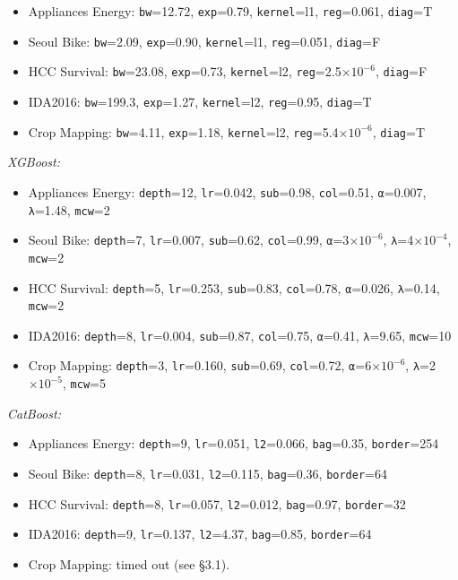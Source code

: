 \documentclass[
  11pt,
  onecolumn]{article}
\providecommand{\tightlist}{%
  \setlength{\itemsep}{0pt}\setlength{\parskip}{0pt}}
\begin{document}
\begin{itemize}
\tightlist
\item
  Appliances Energy: \texttt{bw}=12.72, \texttt{exp}=0.79,
  \texttt{kernel}=l1, \texttt{reg}=0.061, \texttt{diag}=T
\item
  Seoul Bike: \texttt{bw}=2.09, \texttt{exp}=0.90, \texttt{kernel}=l1,
  \texttt{reg}=0.051, \texttt{diag}=F
\item
  HCC Survival: \texttt{bw}=23.08, \texttt{exp}=0.73, \texttt{kernel}=l2,
  \texttt{reg}=2.5\(\times 10^{-6}\), \texttt{diag}=F
\item
  IDA2016: \texttt{bw}=199.3, \texttt{exp}=1.27, \texttt{kernel}=l2,
  \texttt{reg}=0.95, \texttt{diag}=T
\item
  Crop Mapping: \texttt{bw}=4.11, \texttt{exp}=1.18, \texttt{kernel}=l2,
  \texttt{reg}=5.4\(\times 10^{-6}\), \texttt{diag}=T
\end{itemize}

\emph{XGBoost:}

\begin{itemize}
\tightlist
\item
  Appliances Energy: \texttt{depth}=12, \texttt{lr}=0.042,
  \texttt{sub}=0.98, \texttt{col}=0.51, \texttt{α}=0.007,
  \texttt{λ}=1.48, \texttt{mcw}=2
\item
  Seoul Bike: \texttt{depth}=7, \texttt{lr}=0.007, \texttt{sub}=0.62,
  \texttt{col}=0.99, \texttt{α}=3\(\times 10^{-6}\),
  \texttt{λ}=4\(\times 10^{-4}\), \texttt{mcw}=2
\item
  HCC Survival: \texttt{depth}=5, \texttt{lr}=0.253, \texttt{sub}=0.83,
  \texttt{col}=0.78, \texttt{α}=0.026, \texttt{λ}=0.14, \texttt{mcw}=2
\item
  IDA2016: \texttt{depth}=8, \texttt{lr}=0.004, \texttt{sub}=0.87,
  \texttt{col}=0.75, \texttt{α}=0.41, \texttt{λ}=9.65, \texttt{mcw}=10
\item
  Crop Mapping: \texttt{depth}=3, \texttt{lr}=0.160, \texttt{sub}=0.69,
  \texttt{col}=0.72, \texttt{α}=6\(\times 10^{-6}\),
  \texttt{λ}=2\(\times 10^{-5}\), \texttt{mcw}=5
\end{itemize}

\emph{CatBoost:}

\begin{itemize}
\tightlist
\item
  Appliances Energy: \texttt{depth}=9, \texttt{lr}=0.051,
  \texttt{l2}=0.066, \texttt{bag}=0.35, \texttt{border}=254
\item
  Seoul Bike: \texttt{depth}=8, \texttt{lr}=0.031, \texttt{l2}=0.115,
  \texttt{bag}=0.36, \texttt{border}=64
\item
  HCC Survival: \texttt{depth}=8, \texttt{lr}=0.057, \texttt{l2}=0.012,
  \texttt{bag}=0.97, \texttt{border}=32
\item
  IDA2016: \texttt{depth}=9, \texttt{lr}=0.137, \texttt{l2}=4.37,
  \texttt{bag}=0.85, \texttt{border}=64
\item
  Crop Mapping: timed out (see §3.1).
\end{itemize}
\end{document}
